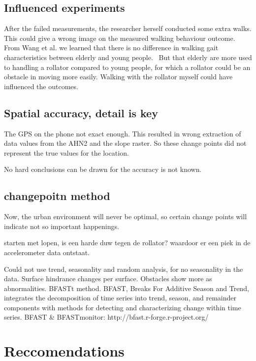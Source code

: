 \subsection{Influenced experiments}
After the failed measurements, the researcher herself conducted some extra walks. This could give a wrong image on the measured walking behaviour outcome. From Wang et al. we learned that there is no difference in walking gait characteristics between elderly and young people.~\cite{Wang2015} But that elderly are more used to handling a rollator compared to young people, for which a rollator could be an obstacle in moving more easily. Walking with the rollator myself could have influenced the outcomes. 


\subsection{Spatial accuracy, detail is key}
The GPS on the phone not exact enough. This resulted in wrong extraction of data values from the AHN2 and the slope raster. So these change points did not represent the true values for the location. 

No hard conclusions can be drawn for the accuracy is not known. 



\subsection{changepoitn method}
Now, the urban environment will never be optimal, so certain change points will indicate not so important happenings. 

starten met lopen, is een harde duw tegen de rollator? waardoor er een piek in de accelerometer data ontstaat. 




Could not use trend, seasonality and random analysis, for no seasonality in the data. Surface hindrance changes per surface. Obstacles show more as abnormalities. BFASTt method. BFAST, Breaks For Additive Season and Trend, integrates the decomposition of time series into trend, season, and remainder components with methods for detecting and characterizing change within time series. BFAST & BFASTmonitor: http://bfast.r-forge.r-project.org/ 
\section{Reccomendations} %

